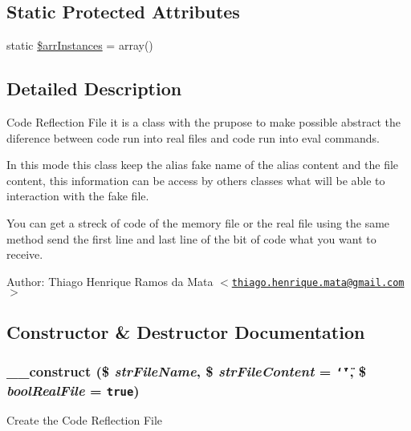 \subsection*{Static Protected Attributes}
\begin{CompactItemize}
\item 
static \hyperlink{class_code_reflection_file_6bb6623babcf344a88383759b04b2b33}{\$arrInstances} = array()
\end{CompactItemize}


\subsection{Detailed Description}
Code Reflection File it is a class with the prupose to make possible abstract the diference between code run into real files and code run into eval commands.

In this mode this class keep the alias fake name of the alias content and the file content, this information can be access by others classes what will be able to interaction with the fake file.

You can get a streck of code of the memory file or the real file using the same method send the first line and last line of the bit of code what you want to receive. \begin{Desc}
\item[Author:]Thiago Henrique Ramos da Mata $<$\href{mailto:thiago.henrique.mata@gmail.com}{\tt thiago.henrique.mata@gmail.com}$>$ \end{Desc}


\subsection{Constructor \& Destructor Documentation}
\hypertarget{class_code_reflection_file_e56ba959bafd263049238cb91edcc360}{
\subsubsection[{\_\-\_\-construct}]{\setlength{\rightskip}{0pt plus 5cm}\_\-\_\-construct (\$ {\em strFileName}, \/  \$ {\em strFileContent} = {\tt \char`\"{}\char`\"{}}, \/  \$ {\em boolRealFile} = {\tt true})}}
\label{class_code_reflection_file_e56ba959bafd263049238cb91edcc360}


Create the Code Reflection File

